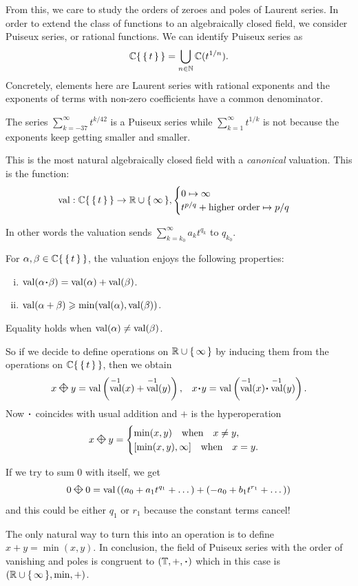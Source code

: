 \documentclass[12pt]{memoir}
\DeclareMathOperator{\val}{val}
\newcommand{\diamondplus}{\mathbin{\rotatebox[origin=c]{45}{$\boxtimes$}}} %
\begin{document}
From this, we care to study the orders of zeroes and poles of Laurent series. In order to extend the class of functions to an algebraically closed field, we consider Puiseux series, or rational functions. We can identify Puiseux series as 
$$\mathbb{C}\{\,\{\,t\,\}\,\}=\bigcup_{n\in\mathbb{N}}\mathbb{C}(t^{1/n}).$$
Concretely, elements here are Laurent series with rational exponents and the exponents of terms with non-zero coefficients have a common denominator. 
\begin{Ex}
    The series $\sum_{k=-37}^{\infty}t^{k/42}$ is a Puiseux series while $\sum_{k=1}^\infty t^{1/k}$ is not because the exponents keep getting smaller and smaller.
\end{Ex}
This is the most natural algebraically closed field with a \emph{canonical} valuation. This is the function:
$$\val: \bC\set{\set{t}}\to\bR\cup\set{\infty},\begin{cases}
    0\mapsto\infty\\
    t^{p/q}+\text{higher order}\mapsto p/q
\end{cases}$$

In other words the valuation sends $\sum_{k=k_0}^\infty a_kt^{q_k}$ to $q_{k_0}$.
\begin{Prop}\label{prop:PropertiesOfValuation}
For $\alpha,\beta\in\mathbb{C}\{\,\{\,t\,\}\,\}$, the valuation enjoys the following properties:
\begin{enumerate}[i.]
    \item $\val(\al\.\bt)=\val(\al)+\val(\bt)$.
    \item $\val(\al+\bt)\geq\min(\val(\al),\val(\bt))$.
\end{enumerate}
Equality holds when $\val(\al)\neq\val(\bt)$.
\end{Prop}
So if we decide to define operations on $\mathbb{R}\cup\{\,\infty\,\}$ by inducing them from the operations on $\mathbb{C}\{\,\{\,t\,\}\,\}$, then we obtain
\begin{align*}
    &x\diamondplus y=\val\left(\val^{-1}(x)+\val^{-1}(y)\right),
    &x\. y=\val\left(\val^{-1}(x)\.\val^{-1}(y)\right).
\end{align*}
Now $\.$ coincides with usual addition and $+$ is the hyperoperation
$$x\diamondplus y=\begin{cases}
    \min(x,y)\word{when}x\neq y,\\
    [\min(x,y),\infty]\word{when}x=y.
\end{cases}$$
\begin{Ex}
    If we try to sum $0$ with itself, we get 
    $$0\diamondplus 0=\val\left((a_0+a_1t^{q_1}+\dots)+(-a_0+b_1t^{r_1}+\dots)\right)$$
    and this could be either $q_1$ or $r_1$ because the constant terms cancel! 
\end{Ex}
The only natural way to turn this into an operation is to define $x+y=\min(x,y)$. In conclusion, the field of Puiseux series with the order of vanishing and poles is congruent to $(\bT,+,\.)$ which in this case is $\left(\mathbb{R}\cup\{\,\infty\,\},\min,+\right)$.
\end{document}

